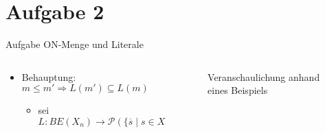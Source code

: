
\section{Aufgabe 2}

\setcounter{exercise}{1}

\begin{frame}[allowframebreaks, t]{Aufgabe \thesection}{ON-Menge und Literale}
  \begin{columns}
    \begin{column}{0.5\textwidth}
      \begin{itemize}
        \item \alert{Behauptung:} $m \leq m' \Rightarrow L(m') \subseteq L(m)$
        \begin{itemize}
          \item sei $L: BE(X_n) \rightarrow \mathcal{P}(\{\overline{s} \mid s\in X_n\}\cup X_n)$
        \end{itemize}
      \end{itemize}
    \end{column}
    \begin{column}{0.5\textwidth}
      \begin{figure}[H]
        \caption{Veranschaulichung anhand eines Beispiels}
      \end{figure}
    \end{column}
  \end{columns}
    \begin{columns}
      \begin{column}[t]{0.5\textwidth}
\end{column}
\end{columns}
\end{frame}
